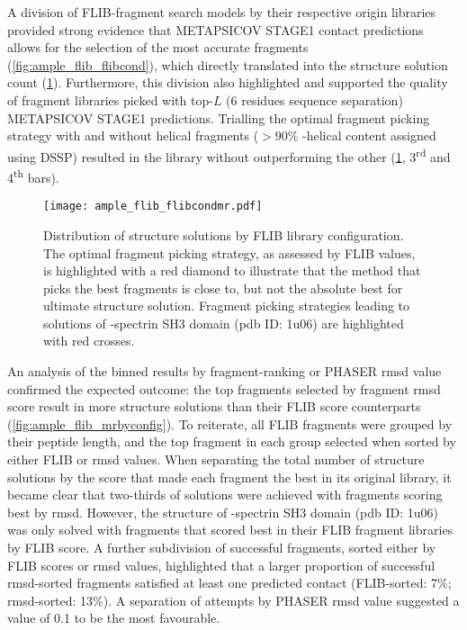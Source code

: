 A division of FLIB-fragment search models by their respective origin libraries provided strong evidence that METAPSICOV STAGE1 contact predictions allows for the selection of the most accurate fragments (\cref{fig:ample_flib_flibcond}), which directly translated into the structure solution count (\cref{fig:ample_flib_flibcondmr}). Furthermore, this division also highlighted and supported the quality of fragment libraries picked with top-$L$ (6 residues sequence separation) METAPSICOV STAGE1 predictions. Trialling the optimal fragment picking strategy with and without helical fragments ($>90$\% \textalpha-helical content assigned using DSSP) resulted in the library without outperforming the other (\cref{fig:ample_flib_flibcondmr}, 3\textsuperscript{rd} and 4\textsuperscript{th} bars). 

\begin{figure}[H]
	\centering
	\texttt{[image: ample\_flib\_flibcondmr.pdf]}
	\caption[MR structure solutions by FLIB library]{Distribution of structure solutions by FLIB library configuration. The optimal fragment picking strategy, as assessed by FLIB values, is highlighted with a red diamond to illustrate that the method that picks the best fragments is close to, but not the absolute best for ultimate structure solution. Fragment picking strategies leading to solutions of \textalpha-spectrin SH3 domain (\gls{pdb} ID: 1u06) are highlighted with red crosses.}
	\label{fig:ample_flib_flibcondmr}
\end{figure}

An analysis of the binned results by fragment-ranking or PHASER \gls{rmsd} value confirmed the expected outcome: the top fragments selected by fragment \gls{rmsd} score result in more structure solutions than their FLIB score counterparts (\cref{fig:ample_flib_mrbyconfig}). To reiterate, all FLIB fragments were grouped by their peptide length, and the top fragment in each group selected when sorted by either FLIB or \gls{rmsd} values. When separating the total number of structure solutions by the score that made each fragment the best in its original library, it became clear that two-thirds of solutions were achieved with fragments scoring best by \gls{rmsd}. However, the structure of \textalpha-spectrin SH3 domain (\gls{pdb} ID: 1u06) was only solved with fragments that scored best in their FLIB fragment libraries by FLIB score. A further subdivision of successful fragments, sorted either by FLIB scores or \gls{rmsd} values, highlighted that a larger proportion of successful \gls{rmsd}-sorted fragments satisfied at least one predicted contact (FLIB-sorted: 7\%; \gls{rmsd}-sorted: 13\%). A separation of attempts by PHASER \gls{rmsd} value suggested a value of 0.1 to be the most favourable.

